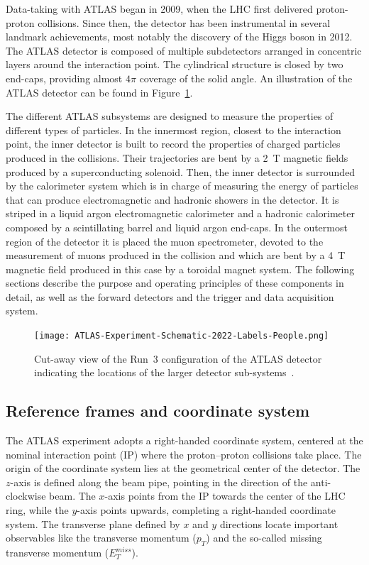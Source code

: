 Data-taking with ATLAS began in 2009, when the LHC first delivered proton-proton collisions. Since then, the detector has been instrumental in several landmark achievements, most notably the discovery of the Higgs boson in 2012. The ATLAS detector is composed of multiple subdetectors arranged in concentric layers 
around the interaction point. The cylindrical structure is closed by two end-caps, providing almost $4\pi$ coverage of the solid angle. An illustration of the ATLAS detector can be found in Figure~\ref{fig:ATLASdet}.

The different ATLAS subsystems are designed to measure the properties of different types of particles. In the innermost region, closest to the interaction point, the inner detector is built to record the properties of charged particles produced in the collisions. Their trajectories 
are bent by a 2~T magnetic fields produced by a superconducting solenoid. Then, the inner detector is surrounded by the calorimeter system which is in charge of measuring the energy of particles that can produce electromagnetic and hadronic showers in the detector. It is striped in a liquid argon electromagnetic calorimeter and a hadronic calorimeter composed by a scintillating barrel and liquid argon end-caps.
In the outermost region of the detector it is placed the muon spectrometer, devoted to the measurement of muons produced in the collision and which are bent by a 4~T magnetic field produced in this case by a toroidal magnet system.
The following sections describe the purpose and operating principles of these components in detail, as well as the forward detectors and the trigger and data acquisition system.

\begin{figure}[htbp]
    \centering
        \texttt{[image: ATLAS-Experiment-Schematic-2022-Labels-People.png]}
    \caption{Cut-away view of the Run~3 configuration of the \acrshort{ATLAS} detector indicating the locations of the larger detector sub-systems~\cite{Bianchi:2837191}.}
    \label{fig:ATLASdet}
\end{figure}

\subsection{Reference frames and coordinate system}
\label{sec:coordinates}

The ATLAS experiment adopts a right-handed coordinate system, centered at the nominal interaction point (IP) where the proton--proton collisions take place. The origin of the coordinate system lies at the geometrical center of the detector. The $z$-axis is defined along the beam pipe, pointing in the direction of the anti-clockwise beam. The $x$-axis points from the IP towards the center of the LHC ring, while the $y$-axis points upwards, 
completing a right-handed coordinate system. The transverse plane defined by $x$ and $y$ directions locate important observables like the transverse momentum ($p_{T}$) and the so-called missing transverse momentum ($E^{miss}_{T}$).

